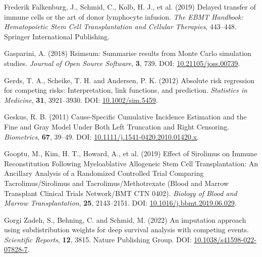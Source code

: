 \documentclass[
  letterpaper,
  DIV=11,
  numbers=noendperiod]{scrreprt}
\newlength{\cslhangindent}
\newlength{\cslentryspacingunit} %
\newenvironment{CSLReferences}[2] %
 {%
  \setlength{\parindent}{0pt}
  \ifodd #1
  \let\oldpar\par
  \def\par{\hangindent=\cslhangindent\oldpar}
  \fi
  \setlength{\parskip}{#2\cslentryspacingunit}
 }%
 {}
\begin{document}
\begin{CSLReferences}{1}{0}
\leavevmode{}%
Frederik Falkenburg, J., Schmid, C., Kolb, H. J., et al. (2019) Delayed
transfer of immune cells or the art of donor lymphocyte infusion.
\emph{The EBMT Handbook: Hematopoietic Stem Cell Transplantation and
Cellular Therapies}, 443--448. Springer International Publishing.

\leavevmode{}%
Gasparini, A. (2018) Rsimsum: {Summarise} results from {Monte Carlo}
simulation studies. \emph{Journal of Open Source Software}, \textbf{3},
739. DOI:
\href{https://doi.org/10.21105/joss.00739}{10.21105/joss.00739}.

\leavevmode{}%
Gerds, T. A., Scheike, T. H. and Andersen, P. K. (2012) Absolute risk
regression for competing risks: Interpretation, link functions, and
prediction. \emph{Statistics in Medicine}, \textbf{31}, 3921--3930. DOI:
\href{https://doi.org/10.1002/sim.5459}{10.1002/sim.5459}.

\leavevmode{}%
Geskus, R. B. (2011) Cause-{Specific Cumulative Incidence Estimation}
and the {Fine} and {Gray Model Under Both Left Truncation} and {Right
Censoring}. \emph{Biometrics}, \textbf{67}, 39--49. DOI:
\href{https://doi.org/10.1111/j.1541-0420.2010.01420.x}{10.1111/j.1541-0420.2010.01420.x}.

\leavevmode{}%
Gooptu, M., Kim, H. T., Howard, A., et al. (2019) Effect of {Sirolimus}
on {Immune Reconstitution Following Myeloablative Allogeneic Stem Cell
Transplantation}: {An Ancillary Analysis} of a {Randomized Controlled
Trial Comparing Tacrolimus}/{Sirolimus} and {Tacrolimus}/{Methotrexate}
({Blood} and {Marrow Transplant Clinical Trials Network}/{BMT CTN}
0402). \emph{Biology of Blood and Marrow Transplantation}, \textbf{25},
2143--2151. DOI:
\href{https://doi.org/10.1016/j.bbmt.2019.06.029}{10.1016/j.bbmt.2019.06.029}.

\leavevmode{}%
Gorgi Zadeh, S., Behning, C. and Schmid, M. (2022) An imputation
approach using subdistribution weights for deep survival analysis with
competing events. \emph{Scientific Reports}, \textbf{12}, 3815. Nature
Publishing Group. DOI:
\href{https://doi.org/10.1038/s41598-022-07828-7}{10.1038/s41598-022-07828-7}.


\end{CSLReferences}
\end{document}
